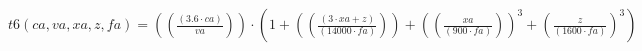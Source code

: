 \documentclass[preview,border=1pt]{standalone}
\begin{document}
$
t6 (ca,va,xa,z,fa) = \left(\left(\frac{\left(\num{3.6}\cdot ca\right)}{va}\right)\right)\cdot \left(\num{1}+\left(\left(\frac{\left(\num{3}\cdot xa+z\right)}{\left(\num{14000}\cdot fa\right)}\right)\right)+\left(\left(\frac{xa}{\left(\num{900}\cdot fa\right)}\right)\right)^{\num{3}}+\left(\frac{z}{\left(\num{1600}\cdot fa\right)}\right)^{\num{3}}\right)
$
\end{document}
